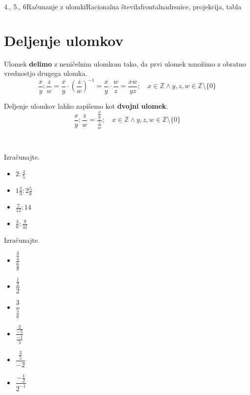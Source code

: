 \begin{priprava}{4., 5., 6}{}{Računanje z ulomki}{Racionalna števila}{frontalna}{drsnice, projekcija, tabla}
~
    

\section{Deljenje ulomkov}


        Ulomek \textbf{delimo} z neničelnim ulomkom tako, da prvi ulomek množimo z obratno vrednostjo drugega ulomka.
        $$\dfrac{x}{y}:\dfrac{z}{w}=\dfrac{x}{y}\cdot\left(\dfrac{z}{w}\right)^{-1}=\dfrac{x}{y}\cdot\dfrac{w}{z}=\dfrac{xw}{yz}; \quad x\in\mathbb{Z}\land y,z,w\in\mathbb{Z}\setminus\{0\} $$
    

    
        Deljenje ulomkov lahko zapišemo kot \textbf{dvojni ulomek}.
        $$\dfrac{x}{y}:\dfrac{z}{w}=\dfrac{\frac{x}{y}}{\frac{z}{w}}; \quad x\in\mathbb{Z}\land y,z,w\in\mathbb{Z}\setminus\{0\} $$
    

        ~





\begin{multicols}{2}


    \begin{naloga}
        Izračunajte.
        \begin{itemize}
            \item $2:\frac{4}{5}$ 
            \item $1\frac{2}{3}:2\frac{5}{6}$ 
            \item $\frac{7}{12}:14$ 
            \item $\frac{3}{8}:\frac{9}{32}$ 
        \end{itemize}
    \end{naloga}




    \begin{naloga}
        Izračunajte.
        \begin{multicols}{2}
        \begin{itemize}
                    \item $\dfrac{\frac{3}{4}}{\frac{6}{8}}$ 
                    \item $\dfrac{\frac{1}{2}}{2}$ 
                    \item $\dfrac{3}{\frac{5}{6}}$ 
                    \item $\dfrac{\frac{2}{-5}}{\frac{-1}{5}}$ 
                    \item $\dfrac{\frac{3}{5}}{-2}$ 
                    \item $\dfrac{-\frac{1}{2}}{2^{-1}}$ 


\end{itemize}
\end{multicols}
\end{naloga}
\end{multicols}
\end{priprava}
